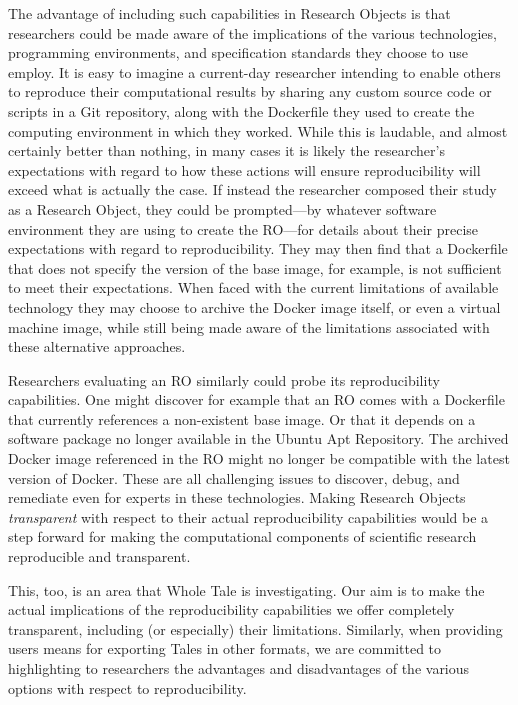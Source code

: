 The advantage of including such capabilities in Research Objects is that researchers could be made aware
	of the implications of the various technologies, programming environments, and specification
	standards they choose to use employ.
It is easy to imagine a current-day researcher intending to enable others to reproduce their computational
	results by sharing any custom source code or scripts in a Git repository, along with the Dockerfile
	they used to create the computing environment in which they worked.
While this is laudable, and almost certainly better than nothing, in many cases it is likely the researcher's
	expectations with regard to how these actions will ensure reproducibility will exceed
	what is actually the case.
If instead the researcher composed their study as a Research Object, they could be prompted---by whatever
	software environment they are using to create the RO---for details about their precise expectations with
	regard to reproducibility.
They may then find that a Dockerfile that does not specify the version of the base image, for example, is not sufficient
	to meet their expectations.
When faced with the current limitations of available technology they may choose to archive the Docker image itself,
	or even a virtual machine image, while still being made aware of the limitations associated with these alternative
	approaches.

Researchers evaluating an RO similarly could probe its reproducibility capabilities.  One might discover for example
	that an RO comes with a Dockerfile that currently references a non-existent base image.
Or that it depends on a software package no longer available in the Ubuntu Apt Repository.
The archived Docker image referenced in the RO might no longer be compatible with the latest version of Docker.
These are all challenging issues to discover, debug, and remediate even for experts in these technologies.
Making Research Objects \emph{transparent} with respect to their actual reproducibility capabilities would be a
	step forward for making the computational components of scientific research reproducible and
	transparent.

This, too, is an area that Whole Tale is investigating.  Our aim is to make the actual implications of the
	reproducibility capabilities we offer completely transparent, including (or especially) their limitations.
Similarly, when providing users means for exporting Tales in other formats, we are committed to highlighting
	to researchers the advantages and disadvantages of the various options with respect to reproducibility.


